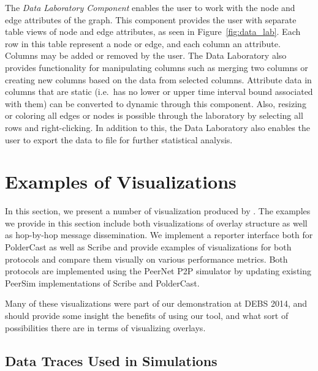 \begin{description}
    The \emph{Data Laboratory Component} enables the user to work with
    the node and edge attributes of the graph. This component provides
    the user with separate table views of node and edge attributes, as
    seen in Figure~\ref{fig:data_lab}. Each row in this table represent
    a node or edge, and each column an attribute. Columns may be added
    or removed by the user. The Data Laboratory also provides
    functionality for manipulating columns such as merging two columns
    or creating new columns based on the data from selected columns.
    Attribute data in columns that are static (i.e.\ has no lower or
    upper time interval bound associated with them) can be converted to
    dynamic through this component. Also, resizing or coloring all edges
    or nodes is possible through the laboratory by selecting all rows
    and right-clicking. In addition to this, the Data Laboratory also
    enables the user to export the data to file for further statistical
    analysis.

\end{description}

\section{Examples of Visualizations}

In this section, we present a number of visualization produced by \demo.
The examples we provide in this section include both visualizations of
overlay structure as well as hop-by-hop message dissemination.  We
implement a reporter interface both for PolderCast as well as Scribe and
provide examples of visualizations for both protocols and compare them
visually on various performance metrics. Both protocols are implemented
using the PeerNet P2P simulator by updating existing PeerSim
implementations of Scribe and PolderCast.

Many of these visualizations were part of our demonstration at
DEBS 2014, and should provide some insight the benefits of using
our tool, and what sort of possibilities there are in terms of
visualizing overlays.

\subsection{Data Traces Used in Simulations}

